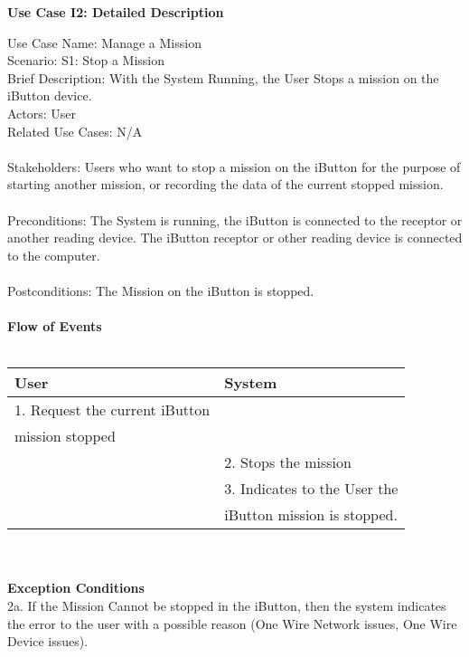 \documentclass[letterpaper]{article}
\begin{document}
\noindent
\begin{center}
\textbf{Use Case I2:  Detailed Description}
\end{center}
Use Case Name:  Manage a Mission\\
Scenario:  S1:  Stop a Mission\\
Brief Description:  With the System Running, the User Stops a
mission on the iButton device.\\
Actors:  User\\
Related Use Cases: N/A\\\\
Stakeholders:  Users who want to stop a mission on the iButton
for the purpose of starting another mission, or recording the data
of the current stopped mission.\\\\
Preconditions:  The System is running, the iButton is connected to
the receptor or another reading device.  The iButton receptor or
other reading device is connected to the computer.\\\\
Postconditions:  The Mission on the iButton is stopped.\\\\
\textbf{Flow of Events}\\\\
\begin{tabular}{|l|l|}\hline
\textbf{User} & \textbf{System}\\\hline
1.  Request the current iButton & \\
mission stopped & \\\hline
& 2.  Stops the mission\\\hline
& 3.  Indicates to the User the \\
& iButton mission is stopped.\\\hline
\end{tabular}\\\\
\textbf{Exception Conditions}\\
2a.  If the Mission Cannot be stopped in the iButton, then the
system indicates the error to the user with a possible reason
(One Wire Network issues, One Wire Device issues).
\end{document}
